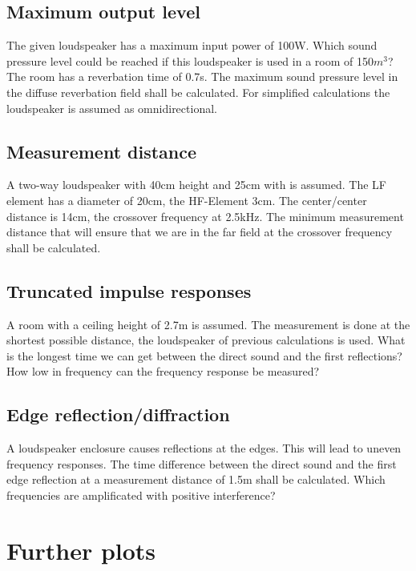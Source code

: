 \documentclass{article}
\begin{document}
\subsection{Maximum output level}
The given loudspeaker has a maximum input power of 100W. Which sound pressure level could be reached if this loudspeaker is used in a room of 150$m^3$? The room has a reverbation time of 0.7s. The maximum sound pressure level in the diffuse reverbation field shall be calculated. For simplified calculations the loudspeaker is assumed as omnidirectional.
\subsection{Measurement distance}
A two-way loudspeaker with 40cm height and 25cm with is assumed. The LF element has a diameter of 20cm, the HF-Element 3cm. The center/center distance is 14cm, the crossover frequency at 2.5kHz. The minimum measurement distance that will ensure that we are in the far field at the crossover frequency shall be calculated.
\subsection{Truncated impulse responses}
A room with a ceiling height of 2.7m is assumed. The measurement is done at the shortest possible distance, the loudspeaker of previous calculations is used. What is the longest time we can get between the direct sound and the first reflections? How low in frequency can the frequency response be measured?
\subsection{Edge reflection/diffraction}
A loudspeaker enclosure causes reflections at the edges. This will lead to uneven frequency responses. The time difference between the direct sound and the first edge reflection at a measurement distance of 1.5m shall be calculated. Which frequencies are amplificated with positive interference?

\section{Further plots}
\end{document}
